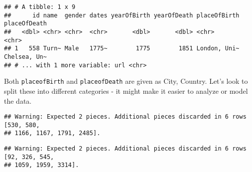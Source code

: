 \documentclass[]{article}
\newenvironment{Shaded}{\begin{snugshade}}{\end{snugshade}}
\newcommand{\DataTypeTok}[1]{\textcolor[rgb]{0.13,0.29,0.53}{#1}}
\newcommand{\KeywordTok}[1]{\textcolor[rgb]{0.13,0.29,0.53}{\textbf{#1}}}
\newcommand{\NormalTok}[1]{#1}
\newcommand{\OperatorTok}[1]{\textcolor[rgb]{0.81,0.36,0.00}{\textbf{#1}}}
\newcommand{\StringTok}[1]{\textcolor[rgb]{0.31,0.60,0.02}{#1}}
\begin{document}
\begin{verbatim}
## # A tibble: 1 x 9
##      id name  gender dates yearOfBirth yearOfDeath placeOfBirth placeOfDeath
##   <dbl> <chr> <chr>  <chr>       <dbl>       <dbl> <chr>        <chr>       
## 1   558 Turn~ Male   1775~        1775        1851 London, Uni~ Chelsea, Un~
## # ... with 1 more variable: url <chr>
\end{verbatim}

Both \texttt{placeofBirth} and \texttt{placeofDeath} are given as City,
Country. Let's look to split these into different categories - it might
make it easier to analyze or model the data.

\begin{Shaded}
\end{Shaded}

\begin{verbatim}
## Warning: Expected 2 pieces. Additional pieces discarded in 6 rows [530, 580,
## 1166, 1167, 1791, 2485].
\end{verbatim}

\begin{verbatim}
## Warning: Expected 2 pieces. Additional pieces discarded in 6 rows [92, 326, 545,
## 1059, 1959, 3314].
\end{verbatim}

\begin{Shaded}
\end{Shaded}
\end{document}
